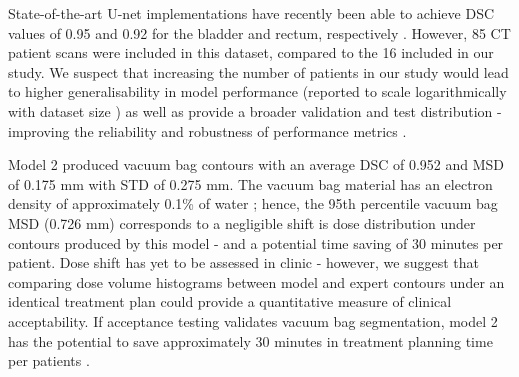 State-of-the-art U-net implementations have recently been able to achieve DSC values of 0.95 and 0.92 for the bladder and rectum, respectively \cite{Kazemifar_2018}. However, 85 CT patient scans were included in this dataset, compared to the 16 included in our study. We suspect that increasing the number of patients in our study would lead to higher generalisability in model performance (reported to scale logarithmically with dataset size \cite{Nemoto_2020}) as well as provide a broader validation and test distribution - improving the reliability and robustness of performance metrics \cite{Ronneberger_2015}. 

Model 2 produced vacuum bag contours with an average DSC of 0.952 and MSD of 0.175 mm with STD of 0.275 mm. The vacuum bag material has an electron density of approximately 0.1\% of water \cite{CITATION}; hence, the 95th percentile vacuum bag MSD (0.726 mm) corresponds to a negligible shift is
dose distribution under contours produced by this model - and a potential time saving of 30 minutes per patient. Dose shift has yet to be assessed  in clinic - however, we suggest that comparing dose volume histograms between model and expert contours under an identical treatment plan could provide a quantitative measure of clinical acceptability.
If acceptance testing validates vacuum bag segmentation, model 2 has the potential to save approximately 30 minutes in treatment planning time per patients \cite{CITATION}.

\newpage




